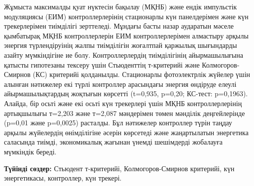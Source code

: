 Жұмыста максималды қуат нүктесін бақылау (МҚНБ) және ендік импульстік
модуляциясы (ЕИМ) контроллерлерінің стационарлы күн панелдерімен және
күн трекерлерімен тиімділігі зерттеледі. Мұндағы басты назар аударатын
мәселе қымбатырақ МҚНБ контроллерлерін ЕИМ контроллерлерімен алмастыру
арқылы энергия түрлендіруінің жалпы тиімділігін жоғалтпай қаржылық
шығындарды азайту мүмкіндігіне ие болу. Контроллерлердің тиімділігінің
айырмашылығына қатысты гипотезаны тексеру үшін Стьюденттің т-критерийі
және Колмогоров-Смирнов (КС) критерийі қолданылды. Стационарлы
фотоэлектрлік жүйелер үшін алынған нәтижелер екі түрлі контроллер
арасындағы энергия өндіруде елеулі айырмашылықтардың жоқтығын көрсетті
(t=0,935, p=0,20; КС-тест: p=0,1963). Алайда, бір осьті және екі осьті
күн трекерлері үшін МҚНБ контроллерлерінің артықшылығы т=2,203 және
т=2,087 мәндерімен төмен мәнділік деңгейлерінде (p=0,01 және p=0,0025)
расталды. Бұл нәтижелер контроллер түрін таңдау арқылы жүйелердің
өнімділігіне әсерін көрсетеді және жаңартылатын энергетика саласында
тиімді, экономикалық жағынан үнемді шешімдерді жобалауға мүмкіндік
береді.

{\bfseries Түйінді сөздер:} Стьюдент т-критерийі, Колмогоров-Смирнов
критерийі, күн энергетикасы, контроллер, күн трекері.

